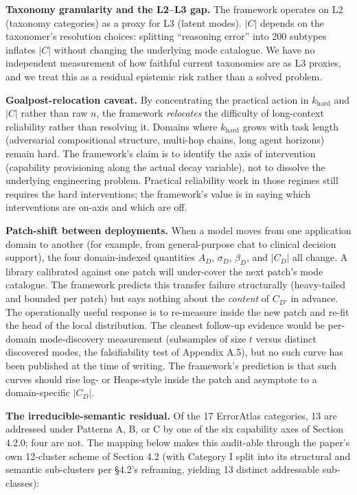 \documentclass[
]{article}
\begin{document}
\textbf{Taxonomy granularity and the L2--L3 gap.} The framework operates
on L2 (taxonomy categories) as a proxy for L3 (latent modes). \(|C|\)
depends on the taxonomer's resolution choices: splitting ``reasoning
error'' into 200 subtypes inflates \(|C|\) without changing the
underlying mode catalogue. We have no independent measurement of how
faithful current taxonomies are as L3 proxies, and we treat this as a
residual epistemic risk rather than a solved problem.

\textbf{Goalpost-relocation caveat.} By concentrating the practical
action in \(k_{\text{hard}}\) and \(|C|\) rather than raw \(n\), the
framework \emph{relocates} the difficulty of long-context reliability
rather than resolving it. Domains where \(k_{\text{hard}}\) grows with
task length (adversarial compositional structure, multi-hop chains, long
agent horizons) remain hard. The framework's claim is to identify the
axis of intervention (capability provisioning along the actual decay
variable), not to dissolve the underlying engineering problem. Practical
reliability work in those regimes still requires the hard interventions;
the framework's value is in saying which interventions are on-axis and
which are off.

\textbf{Patch-shift between deployments.} When a model moves from one
application domain to another (for example, from general-purpose chat to
clinical decision support), the four domain-indexed quantities \(A_D\),
\(\sigma_D\), \(\beta_D\), and \(|C_D|\) all change. A library
calibrated against one patch will under-cover the next patch's mode
catalogue. The framework predicts this transfer failure structurally
(heavy-tailed and bounded per patch) but says nothing about the
\emph{content} of \(C_{D'}\) in advance. The operationally useful
response is to re-measure inside the new patch and re-fit the head of
the local distribution. The cleanest follow-up evidence would be
per-domain mode-discovery measurement (subsamples of size \(t\) versus
distinct discovered modes, the falsifiability test of Appendix A.5), but
no such curve has been published at the time of writing. The framework's
prediction is that such curves should rise log- or Heaps-style inside
the patch and asymptote to a domain-specific \(|C_D|\).

\textbf{The irreducible-semantic residual.} Of the 17 ErrorAtlas
categories, 13 are addressed under Patterns A, B, or C by one of the six
capability axes of Section 4.2.0; four are not. The mapping below makes
this audit-able through the paper's own 12-cluster scheme of Section 4.2
(with Category I split into its structural and semantic sub-clusters per
§4.2's reframing, yielding 13 distinct addressable sub-classes):
\end{document}
